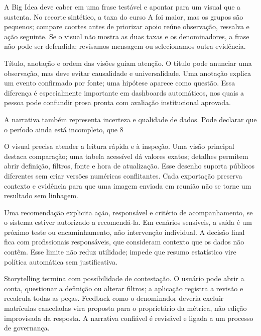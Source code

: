 A Big Idea deve caber em uma frase testável e apontar para um visual que a sustenta. No recorte sintético, a taxa do curso A foi maior, mas os grupos são pequenos; compare coortes antes de priorizar apoio reúne observação, ressalva e ação seguinte. Se o visual não mostra as duas taxas e os denominadores, a frase não pode ser defendida; revisamos mensagem ou selecionamos outra evidência.

Título, anotação e ordem das visões guiam atenção. O título pode anunciar uma observação, mas deve evitar causalidade e universalidade. Uma anotação explica um evento confirmado por fonte; uma hipótese aparece como questão. Essa diferença é especialmente importante em dashboards automáticos, nos quais a pessoa pode confundir prosa pronta com avaliação institucional aprovada.

A narrativa também representa incerteza e qualidade de dados. Pode declarar que o período ainda está incompleto, que 8%

O visual precisa atender a leitura rápida e à inspeção. Uma visão principal destaca comparação; uma tabela acessível dá valores exatos; detalhes permitem abrir definição, filtros, fonte e hora de atualização. Esse desenho suporta públicos diferentes sem criar versões numéricas conflitantes. Cada exportação preserva contexto e evidência para que uma imagem enviada em reunião não se torne um resultado sem linhagem.

Uma recomendação explicita ação, responsável e critério de acompanhamento, se o sistema estiver autorizado a recomendá-la. Em cenários sensíveis, a saída é um próximo teste ou encaminhamento, não intervenção individual. A decisão final fica com profissionais responsáveis, que consideram contexto que os dados não contêm. Esse limite não reduz utilidade; impede que resumo estatístico vire política automática sem justificativa.

Storytelling termina com possibilidade de contestação. O usuário pode abrir a conta, questionar a definição ou alterar filtros; a aplicação registra a revisão e recalcula todas as peças. Feedback como o denominador deveria excluir matrículas canceladas vira proposta para o proprietário da métrica, não edição improvisada da resposta. A narrativa confiável é revisável e ligada a um processo de governança.

